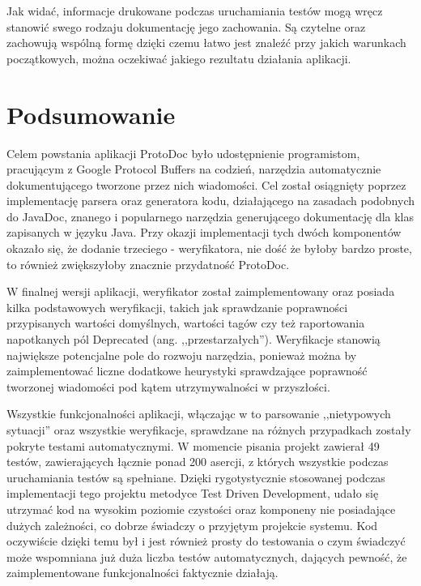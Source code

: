 \documentclass[pdflatex,11pt]{aghdpl}
\begin{document}
Jak widać, informacje drukowane podczas uruchamiania testów mogą wręcz stanowić swego rodzaju dokumentację jego zachowania.
Są czytelne oraz zachowują wspólną formę dzięki czemu łatwo jest znaleźć przy jakich warunkach początkowych, można oczekiwać 
jakiego rezultatu działania aplikacji.

\chapter{Podsumowanie}
\label{cha:podsumowanie}
Celem powstania aplikacji ProtoDoc było udostępnienie programistom, pracującym z Google Protocol Buffers na codzień, narzędzia 
automatycznie dokumentującego tworzone przez nich wiadomości. Cel został osiągnięty poprzez implementację parsera 
oraz generatora kodu, działającego na zasadach podobnych do JavaDoc, znanego i popularnego narzędzia generującego dokumentację
dla klas zapisanych w języku Java. Przy okazji implementacji tych dwóch komponentów okazało się, że dodanie trzeciego - weryfikatora,
nie dość że byłoby bardzo proste, to również zwiększyłoby znacznie przydatność ProtoDoc. 

W finalnej wersji aplikacji, weryfikator został zaimplementowany oraz posiada kilka podstawowych weryfikacji, takich jak sprawdzanie poprawności
przypisanych wartości domyślnych, wartości tagów czy też raportowania napotkanych pól Deprecated (ang. ,,przestarzałych''). 
Weryfikacje stanowią największe potencjalne pole do rozwoju narzędzia, ponieważ można by zaimplementować liczne dodatkowe heurystyki 
sprawdzające poprawność tworzonej wiadomości pod kątem utrzymywalności w przyszłości.

Wszystkie funkcjonalności aplikacji, włączając w to parsowanie ,,nietypowych sytuacji'' oraz wszystkie weryfikacje, sprawdzane na różnych przypadkach
zostały pokryte testami automatycznymi. W momencie pisania projekt zawierał 49 testów, zawierających łącznie ponad 200 asercji, z których wszystkie podczas
uruchamiania testów są spełniane. Dzięki rygotystycznie stosowanej podczas implementacji tego projektu metodyce Test Driven Development, udało się utrzymać kod na 
wysokim poziomie czystości oraz komponeny nie posiadające dużych zależności, co dobrze świadczy o przyjętym projekcie systemu.
Kod oczywiście dzięki temu był i jest również prosty do testowania o czym świadczyć może wspomniana już duża liczba testów automatycznych, 
dających pewność, że zaimplementowane funkcjonalności faktycznie działają.
\end{document}
